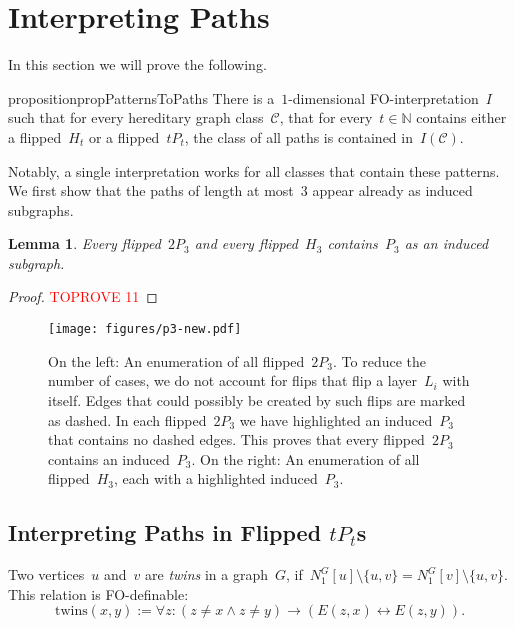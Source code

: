 \documentclass[11pt]{article}      \usepackage[margin=1in]{geometry}  \usepackage{microtype}
\newtheorem{lemma}[theorem]{Lemma}
\theoremstyle{definition}
\newcommand{\N}[0]{\mathrm{\mathbb{N}}}
\newcommand{\twins}{\mathrm{twins}}
\newcommand{\CC}{\mathcal{C}}
\begin{document}
\section{Interpreting Paths}\label{sec:interpreting}

In this section we will prove the following.
\begin{restatable}{proposition}{propPatternsToPaths}
\label{prop:patternsToPaths}
    There is a~$1$-dimensional FO-interpretation~$I$ such that for every hereditary graph class~$\CC$, that for every~$t\in\N$ contains either a flipped~$H_t$ or a flipped~$tP_t$,
    the class of all paths is contained in~$I(\CC)$.
\end{restatable}

Notably, a single interpretation works for all classes that contain these patterns.
We first show that the paths of length at most~$3$ appear already as induced subgraphs.

\begin{lemma}\label{lem:p3-from-swimlane}
    Every flipped~$2P_{3}$ and every flipped~$H_3$ contains~$P_3$ as an induced subgraph.
\end{lemma}

\begin{proof}\textcolor{red}{TOPROVE 11}\end{proof}

\begin{figure}[htbp]
    \centering
    \texttt{[image: figures/p3-new.pdf]}
    \caption{On the left: An enumeration of all flipped~$2P_3$.
    To reduce the number of cases, we do not account for flips that flip a layer~$L_i$ with itself. Edges that could possibly be created by such flips are marked as dashed.
    In each flipped~$2P_3$ we have highlighted an induced~$P_3$ that contains no dashed edges.
    This proves that every flipped~$2P_3$ contains an induced~$P_3$.
    On the right: An enumeration of all flipped~$H_3$, each with a highlighted induced~$P_3$.
    }
    \label{fig:p3}
\end{figure}


\subsection{Interpreting Paths in Flipped \texorpdfstring{$tP_t$s}{tPts}}


Two vertices~$u$ and~$v$ are \emph{twins} in a graph~$G$, if~$N^G_1[u]\setminus \{ u,v \} = N^G_1[v]\setminus \{ u,v \}$.
This relation is FO-definable:
\[
    \twins(x,y) := \forall z : (z \neq x \wedge z \neq y) \rightarrow (E(z,x) \leftrightarrow E(z,y)).
\]
\end{document}
